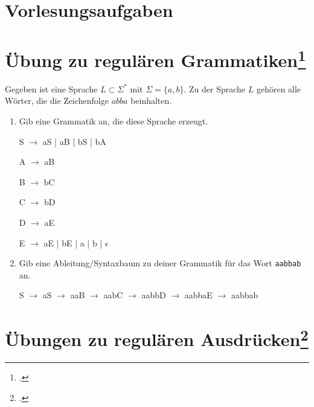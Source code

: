 \documentclass{lehramt-informatik-aufgabe}
\begin{document}
\section{Vorlesungsaufgaben
}

\section{Übung zu regulären Grammatiken\footcite[Seite 21]{theoinf:fs:1}}

Gegeben ist eine Sprache $L \subset \Sigma^*$ mit $\Sigma = \{a, b\}$. Zu
der Sprache $L$ gehören alle Wörter, die die Zeichenfolge $abba$
beinhalten.

\begin{enumerate}
\item Gib eine Grammatik an, die diese Sprache erzeugt.

\begin{liAntwort}
S $\rightarrow$ aS | aB | bS | bA

A $\rightarrow$ aB

B $\rightarrow$ bC

C $\rightarrow$ bD

D $\rightarrow$ aE

E $\rightarrow$ aE | bE | a | b | $\epsilon$
\end{liAntwort}

\item Gib eine Ableitung/Syntaxbaum zu deiner Grammatik für das Wort
\texttt{aabbab} an.

\begin{liAntwort}
S $\rightarrow$
aS $\rightarrow$
aaB $\rightarrow$
aabC $\rightarrow$
aabbD $\rightarrow$
aabbaE $\rightarrow$
aabbab
\end{liAntwort}
\end{enumerate}

%

\section{Übungen zu regulären Ausdrücken\footcite[Seite 21]{theoinf:fs:1}}
\end{document}
